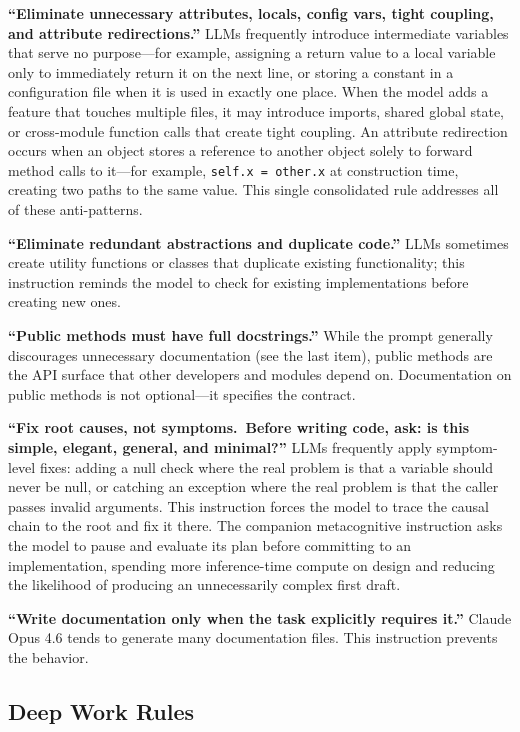 \documentclass{article}
\begin{document}
\textbf{``Eliminate unnecessary attributes, locals, config vars, tight coupling, and attribute redirections.''}  LLMs frequently introduce intermediate variables that serve no purpose---for example, assigning a return value to a local variable only to immediately return it on the next line, or storing a constant in a configuration file when it is used in exactly one place.  When the model adds a feature that touches multiple files, it may introduce imports, shared global state, or cross-module function calls that create tight coupling.  An attribute redirection occurs when an object stores a reference to another object solely to forward method calls to it---for example, \texttt{self.x = other.x} at construction time, creating two paths to the same value.  This single consolidated rule addresses all of these anti-patterns.

\textbf{``Eliminate redundant abstractions and duplicate code.''}  LLMs sometimes create utility functions or classes that duplicate existing functionality; this instruction reminds the model to check for existing implementations before creating new ones.

\textbf{``Public methods must have full docstrings.''}  While the prompt generally discourages unnecessary documentation (see the last item), public methods are the API surface that other developers and modules depend on.  Documentation on public methods is not optional---it specifies the contract.

\textbf{``Fix root causes, not symptoms.\ Before writing code, ask: is this simple, elegant, general, and minimal?''}  LLMs frequently apply symptom-level fixes: adding a null check where the real problem is that a variable should never be null, or catching an exception where the real problem is that the caller passes invalid arguments.  This instruction forces the model to trace the causal chain to the root and fix it there.  The companion metacognitive instruction asks the model to pause and evaluate its plan before committing to an implementation, spending more inference-time compute on design and reducing the likelihood of producing an unnecessarily complex first draft.

\textbf{``Write documentation only when the task explicitly requires it.''}  Claude Opus 4.6 tends to generate many documentation files.  This instruction prevents the behavior.

\subsection{Deep Work Rules}
\end{document}
